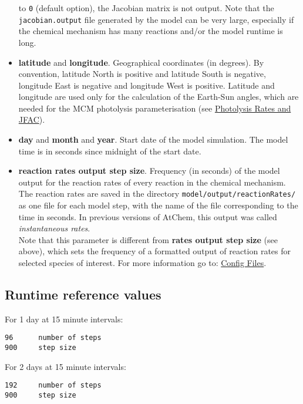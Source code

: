 \begin{itemize}
  to \texttt{0} (default option), the Jacobian matrix is not
  output. Note that the \texttt{jacobian.output} file generated by the
  model can be very large, especially if the chemical mechanism has
  many reactions and/or the model runtime is long.
\item \textbf{latitude} and \textbf{longitude}. Geographical
  coordinates (in degrees). By convention, latitude North is positive
  and latitude South is negative, longitude East is negative and
  longitude West is positive. Latitude and longitude are used only for
  the calculation of the Earth-Sun angles, which are needed for the
  MCM photolysis parameterisation (see
  \hyperref[sec:photolysis]{Photolysis Rates and JFAC}).
\item \textbf{day} and \textbf{month} and \textbf{year}. Start date of
  the model simulation. The model time is in seconds since midnight of
  the start date.
\item \textbf{reaction rates output step size}. Frequency (in seconds)
  of the model output for the reaction rates of every reaction in the
  chemical mechanism. The reaction rates are saved in the directory
  \texttt{model/output/reactionRates/} as one file for each model
  step, with the name of the file corresponding to the time in
  seconds. In previous versions of AtChem, this output was called
  \emph{instantaneous rates}.\\ Note that this parameter is different
  from \textbf{rates output step size} (see above), which sets the
  frequency of a formatted output of reaction rates for selected
  species of interest. For more information go to:
  \hyperref[sec:config]{Config Files}.
\end{itemize}

\subsection{Runtime reference
  values} \label{subsec:runtime-reference-values}

For 1 day at 15 minute intervals:

\begin{verbatim}
96      number of steps
900     step size
\end{verbatim}

For 2 days at 15 minute intervals:

\begin{verbatim}
192     number of steps
900     step size
\end{verbatim}

